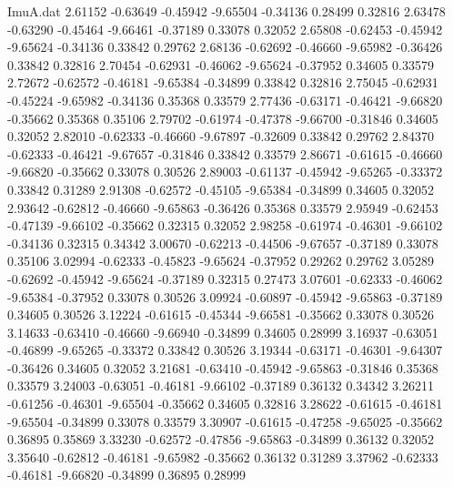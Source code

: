 \begin{filecontents}{ImuA.dat}
   2.61152   -0.63649   -0.45942   -9.65504   -0.34136    0.28499    0.32816
   2.63478   -0.63290   -0.45464   -9.66461   -0.37189    0.33078    0.32052
   2.65808   -0.62453   -0.45942   -9.65624   -0.34136    0.33842    0.29762
   2.68136   -0.62692   -0.46660   -9.65982   -0.36426    0.33842    0.32816
   2.70454   -0.62931   -0.46062   -9.65624   -0.37952    0.34605    0.33579
   2.72672   -0.62572   -0.46181   -9.65384   -0.34899    0.33842    0.32816
   2.75045   -0.62931   -0.45224   -9.65982   -0.34136    0.35368    0.33579
   2.77436   -0.63171   -0.46421   -9.66820   -0.35662    0.35368    0.35106
   2.79702   -0.61974   -0.47378   -9.66700   -0.31846    0.34605    0.32052
   2.82010   -0.62333   -0.46660   -9.67897   -0.32609    0.33842    0.29762
   2.84370   -0.62333   -0.46421   -9.67657   -0.31846    0.33842    0.33579
   2.86671   -0.61615   -0.46660   -9.66820   -0.35662    0.33078    0.30526
   2.89003   -0.61137   -0.45942   -9.65265   -0.33372    0.33842    0.31289
   2.91308   -0.62572   -0.45105   -9.65384   -0.34899    0.34605    0.32052
   2.93642   -0.62812   -0.46660   -9.65863   -0.36426    0.35368    0.33579
   2.95949   -0.62453   -0.47139   -9.66102   -0.35662    0.32315    0.32052
   2.98258   -0.61974   -0.46301   -9.66102   -0.34136    0.32315    0.34342
   3.00670   -0.62213   -0.44506   -9.67657   -0.37189    0.33078    0.35106
   3.02994   -0.62333   -0.45823   -9.65624   -0.37952    0.29262    0.29762
   3.05289   -0.62692   -0.45942   -9.65624   -0.37189    0.32315    0.27473
   3.07601   -0.62333   -0.46062   -9.65384   -0.37952    0.33078    0.30526
   3.09924   -0.60897   -0.45942   -9.65863   -0.37189    0.34605    0.30526
   3.12224   -0.61615   -0.45344   -9.66581   -0.35662    0.33078    0.30526
   3.14633   -0.63410   -0.46660   -9.66940   -0.34899    0.34605    0.28999
   3.16937   -0.63051   -0.46899   -9.65265   -0.33372    0.33842    0.30526
   3.19344   -0.63171   -0.46301   -9.64307   -0.36426    0.34605    0.32052
   3.21681   -0.63410   -0.45942   -9.65863   -0.31846    0.35368    0.33579
   3.24003   -0.63051   -0.46181   -9.66102   -0.37189    0.36132    0.34342
   3.26211   -0.61256   -0.46301   -9.65504   -0.35662    0.34605    0.32816
   3.28622   -0.61615   -0.46181   -9.65504   -0.34899    0.33078    0.33579
   3.30907   -0.61615   -0.47258   -9.65025   -0.35662    0.36895    0.35869
   3.33230   -0.62572   -0.47856   -9.65863   -0.34899    0.36132    0.32052
   3.35640   -0.62812   -0.46181   -9.65982   -0.35662    0.36132    0.31289
   3.37962   -0.62333   -0.46181   -9.66820   -0.34899    0.36895    0.28999

\end{filecontents}
